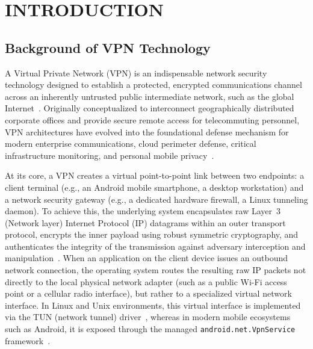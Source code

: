 
\chapter{INTRODUCTION}
\label{chap:introduction}

\section{Background of VPN Technology}
\label{sec:vpn_background}

A Virtual Private Network (VPN) is an indispensable network security technology designed to establish a protected, encrypted communications channel across an inherently untrusted public intermediate network, such as the global Internet~\cite{stallings2022cryptography}. Originally conceptualized to interconnect geographically distributed corporate offices and provide secure remote access for telecommuting personnel, VPN architectures have evolved into the foundational defense mechanism for modern enterprise communications, cloud perimeter defense, critical infrastructure monitoring, and personal mobile privacy~\cite{menezes1996handbook,rfc4301}.

At its core, a VPN creates a virtual point-to-point link between two endpoints: a client terminal (e.g., an Android mobile smartphone, a desktop workstation) and a network security gateway (e.g., a dedicated hardware firewall, a Linux tunneling daemon). To achieve this, the underlying system encapsulates raw Layer~3 (Network layer) Internet Protocol (IP) datagrams within an outer transport protocol, encrypts the inner payload using robust symmetric cryptography, and authenticates the integrity of the transmission against adversary interception and manipulation~\cite{ferguson2010cryptography}. When an application on the client device issues an outbound network connection, the operating system routes the resulting raw IP packets not directly to the local physical network adapter (such as a public Wi-Fi access point or a cellular radio interface), but rather to a specialized virtual network interface. In Linux and Unix environments, this virtual interface is implemented via the TUN (network tunnel) driver~\cite{donenfeld2017wireguard}, whereas in modern mobile ecosystems such as Android, it is exposed through the managed \texttt{android.net.VpnService} framework~\cite{android_vpnservice_docs}.

